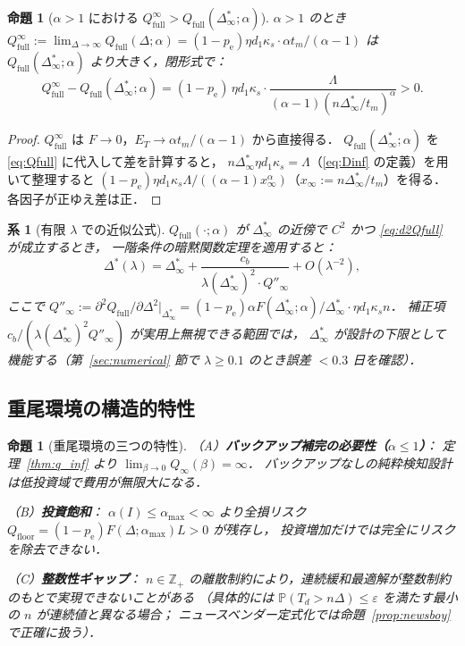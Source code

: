 \documentclass[12pt,a4paper]{article}
\theoremstyle{plain}
\newtheorem{proposition}[theorem]{命題}
\newtheorem{corollary}[theorem]{系}
\theoremstyle{definition}
\theoremstyle{remark}
\newcommand{\Prob}{\mathbb{P}}
\newcommand{\Z}{\mathbb{Z}}
\newcommand{\pe}{p_{\mathrm{e}}}
\newcommand{\Qf}{Q_{\mathrm{full}}}
\newcommand{\Qinf}{Q_{\infty}}
\newcommand{\alphI}{\alpha(I)}
\newcommand{\Dopt}{\Delta^{*}}
\newcommand{\Dinf}{\Delta^{*}_{\infty}}
\newcommand{\La}{\Lambda}   %
\begin{document}
\begin{proposition}[$\alpha>1$ における $\Qf^\infty>\Qf(\Dinf;\alpha)$]\label{prop:gap}
$\alpha>1$ のとき $\Qf^\infty:=\lim_{\Delta\to\infty}\Qf(\Delta;\alpha)=(1-\pe)\eta d_1\kappa_s\cdot\alpha t_m/(\alpha-1)$ は
$\Qf(\Dinf;\alpha)$ より大きく，閉形式で：
\begin{equation}\label{eq:gap}
\Qf^\infty-\Qf(\Dinf;\alpha)
=(1-\pe)\,\eta d_1\kappa_s\cdot\frac{\La}{(\alpha-1)(n\Dinf/t_m)^\alpha}>0.
\end{equation}
\end{proposition}

\begin{proof}
$\Qf^\infty$ は $F\to0$，$E_T\to\alpha t_m/(\alpha-1)$ から直接得る．
$\Qf(\Dinf;\alpha)$ を \eqref{eq:Qfull} に代入して差を計算すると，
$n\Dinf\eta d_1\kappa_s=\La$（\eqref{eq:Dinf} の定義）を用いて整理すると
$(1-\pe)\eta d_1\kappa_s\La/((\alpha-1)x_\infty^\alpha)$（$x_\infty:=n\Dinf/t_m$）を得る．
各因子が正ゆえ差は正．
\end{proof}

\begin{corollary}[有限 $\lambda$ での近似公式]\label{cor:taylor}
$\Qf(\cdot;\alpha)$ が $\Dinf$ の近傍で $C^2$ かつ \eqref{eq:d2Qfull} が成立するとき，
一階条件の暗黙関数定理を適用すると：
\begin{equation}\label{eq:taylor}
\Dopt(\lambda)=\Dinf+\frac{c_b}{\lambda(\Dinf)^2\cdot Q''_{\infty}}+O(\lambda^{-2}),
\end{equation}
ここで $Q''_{\infty}:=\partial^2\Qf/\partial\Delta^2|_{\Dinf}=(1-\pe)\alpha F(\Dinf;\alpha)/\Dinf\cdot\eta d_1\kappa_s n$．
補正項 $c_b/(\lambda(\Dinf)^2 Q''_{\infty})$ が実用上無視できる範囲では，
$\Dinf$ が設計の下限として機能する（第~\ref{sec:numerical} 節で $\lambda\ge0.1$ のとき誤差 $<0.3$ 日を確認）．
\end{corollary}

\subsection{重尾環境の構造的特性}

\begin{proposition}[重尾環境の三つの特性]\label{prop:structural}
\noindent（A）\textbf{バックアップ補完の必要性（$\alpha\le1$）}：
定理~\ref{thm:q_inf} より $\lim_{\beta\to0}\Qinf(\beta)=\infty$．
バックアップなしの純粋検知設計は低投資域で費用が無限大になる．

\noindent（B）\textbf{投資飽和}：
$\alphI\le\alpha_{\max}<\infty$ より全損リスク $Q_{\mathrm{floor}}=(1-\pe)F(\Delta;\alpha_{\max})L>0$ が残存し，
投資増加だけでは完全にリスクを除去できない．

\noindent（C）\textbf{整数性ギャップ}：
$n\in\Z_+$ の離散制約により，連続緩和最適解が整数制約のもとで実現できないことがある
（具体的には $\Prob(T_d>n\Delta)\le\varepsilon$ を満たす最小の $n$ が連続値と異なる場合；
ニュースベンダー定式化では命題~\ref{prop:newsboy} で正確に扱う）．
\end{proposition}
\end{document}
